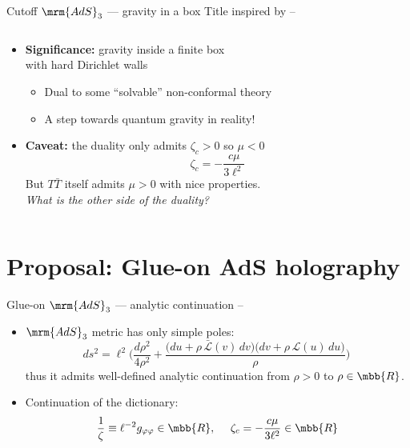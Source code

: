 \documentclass[
	10pt
	,handout
	,noamsthm
]{beamer}
\newcommand{\TTbar}{\texorpdfstring{\ensuremath{T\bar{T}}}{TTbar}\xspace}
\begin{document}
\begin{frame}{Cutoff $\mrm{AdS}_3$ --- gravity in a box}{%
	Title inspired by
	\textcite{Kraus:2021cwf} -- %
}
\begin{columns}
\figCutoffAds
\hspace{-1em}
\begin{column}{.75\textwidth}
\vspace{-.5\baselineskip}
	\begin{itemize}
	\item \textbf{Significance:} gravity inside a finite box\\
		with hard Dirichlet walls
	
	\begin{itemize}
		\item Dual to some ``solvable'' non-conformal theory
		\item A step towards quantum gravity in reality!
	\end{itemize}
	
\pause
	\item \textbf{Caveat:} the duality only admits $\zeta_c > 0$ so $\mu < 0$
	\begin{equation}
		\zeta_c = - \frac{c \mu}{3\ell^2}
	\end{equation}
	But \TTbar itself admits $\mu > 0$ with nice properties.\\
	\textit{What is the other side of the duality?}
	\end{itemize}
\end{column}
\end{columns}
\end{frame}

\section{\textbf{Proposal:} Glue-on AdS holography} \label{se:glueonproposal}

\begin{frame}{Glue-on $\mrm{AdS}_3$ --- analytic continuation}{%
	\textcite{Apolo:2023vnm} -- 
}
	\begin{itemize}
	\item $\mrm{AdS}_3$ metric has only simple poles:
	\begin{equation}
		ds^2 = \ell^2 \bigg( \frac{d\rho^2}{4 \rho^2} + \frac{ \big( du + \rho \, \mathcal {\bar L}(v)\, dv \big) \big( dv + \rho \, \mathcal L(u)\, du \big) }{\rho} \bigg)\ %
	\end{equation}
	thus it admits well-defined analytic continuation from $\rho > 0$ to $\rho \in \mbb{R}$.
	\item Continuation of the dictionary:
	\begin{equation}
		\frac{1}{\zeta} \equiv \ell^{-2} g_{\varphi\varphi} \in \mbb{R},
	\ \quad
		\zeta_c = - \frac{c \mu}{3\ell^2} \in \mbb{R}
	\end{equation}
	
	\end{itemize}
\end{frame}
\end{document}

